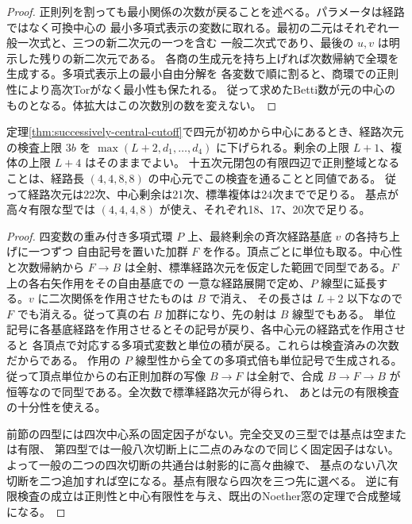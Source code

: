 \begin{proof}
正則列を割っても最小関係の次数が戻ることを述べる。パラメータは経路ではなく可換中心の
最小多項式表示の変数に取れる。最初の二元はそれぞれ一般一次式と、三つの新二次元の一つを含む
一般二次式であり、最後の $u,v$ は明示した残りの新二次元である。
各商の生成元を持ち上げれば次数帰納で全環を生成する。多項式表示上の最小自由分解を
各変数で順に割ると、商環での正則性により高次Torがなく最小性も保たれる。
従って求めたBetti数が元の中心のものとなる。体拡大はこの次数別の数を変えない。
\end{proof}

\begin{proposition}\label{prop:central-arrow-module-cutoff}
定理\ref{thm:successively-central-cutoff}で四元が初めから中心にあるとき、経路次元の検査上限
$3b$ を $\max(L+2,d_1,\ldots,d_4)$ に下げられる。剰余の上限 $L+1$、複体の上限 $L+4$ はそのままでよい。
十五次元閉包の有限四辺で正則整域となることは、経路長 $(4,4,8,8)$ の中心元でこの検査を通ることと同値である。
従って経路次元は22次、中心剰余は21次、標準複体は24次までで足りる。
基点が高々有限な型では $(4,4,4,8)$ が使え、それぞれ18、17、20次で足りる。
\end{proposition}
\begin{proof}
四変数の重み付き多項式環 $P$ 上、最終剰余の斉次経路基底 $v$ の各持ち上げに一つずつ
自由記号を置いた加群 $F$ を作る。頂点ごとに単位も取る。中心性と次数帰納から $F\to B$
は全射、標準経路次元を仮定した範囲で同型である。$F$ 上の各右矢作用をその自由基底での
一意な経路展開で定め、$P$ 線型に延長する。$v$ に二次関係を作用させたものは $B$ で消え、
その長さは $L+2$ 以下なので $F$ でも消える。従って真の右 $B$ 加群になり、先の射は $B$ 線型でもある。
単位記号に各基底経路を作用させるとその記号が戻り、各中心元の経路式を作用させると
各頂点で対応する多項式変数と単位の積が戻る。これらは検査済みの次数だからである。
作用の $P$ 線型性から全ての多項式倍も単位記号で生成される。従って頂点単位からの右正則加群の写像
$B\to F$ は全射で、合成 $B\to F\to B$ が恒等なので同型である。全次数で標準経路次元が得られ、
あとは元の有限検査の十分性を使える。

前節の四型には四次中心系の固定因子がない。完全交叉の三型では基点は空または有限、
第四型では一般八次切断上に二点のみなので同じく固定因子はない。
よって一般の二つの四次切断の共通台は射影的に高々曲線で、
基点のない八次切断を二つ追加すれば空になる。基点有限なら四次を三つ先に選べる。
逆に有限検査の成立は正則性と中心有限性を与え、既出のNoether窓の定理で合成整域になる。
\end{proof}
